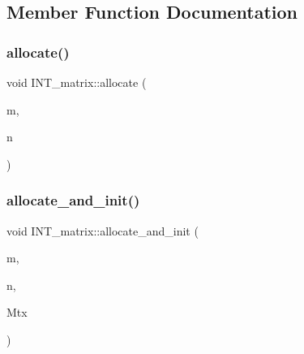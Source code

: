 \subsection{Member Function Documentation}
\mbox{\label{class_i_n_t__matrix_aefd72cf83a84c14335eca38fc854c73f}} 
\subsubsection{\texorpdfstring{allocate()}{allocate()}}
{\footnotesize\ttfamily void I\+N\+T\+\_\+matrix\+::allocate (\begin{DoxyParamCaption}\item[{\mbox{\hyperlink{galois_8h_a09fddde158a3a20bd2dcadb609de11dc}{I\+NT}}}]{m,  }\item[{\mbox{\hyperlink{galois_8h_a09fddde158a3a20bd2dcadb609de11dc}{I\+NT}}}]{n }\end{DoxyParamCaption})}

\mbox{\label{class_i_n_t__matrix_ab0da3cef27c4ce8c4e30a71d9bb977de}} 
\subsubsection{\texorpdfstring{allocate\+\_\+and\+\_\+init()}{allocate\_and\_init()}}
{\footnotesize\ttfamily void I\+N\+T\+\_\+matrix\+::allocate\+\_\+and\+\_\+init (\begin{DoxyParamCaption}\item[{\mbox{\hyperlink{galois_8h_a09fddde158a3a20bd2dcadb609de11dc}{I\+NT}}}]{m,  }\item[{\mbox{\hyperlink{galois_8h_a09fddde158a3a20bd2dcadb609de11dc}{I\+NT}}}]{n,  }\item[{\mbox{\hyperlink{galois_8h_a09fddde158a3a20bd2dcadb609de11dc}{I\+NT}} $\ast$}]{Mtx }\end{DoxyParamCaption})}

\mbox{\label{class_i_n_t__matrix_a7d7429023e6a92987b66c3450ef38944}} 

